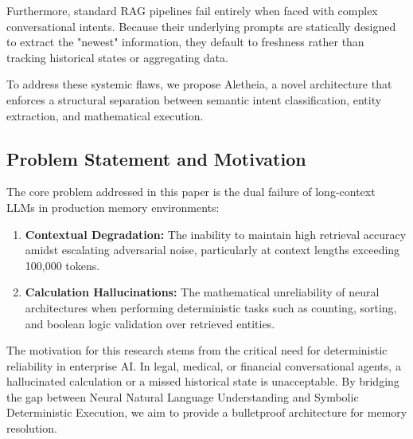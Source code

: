 \documentclass[journal,10pt]{IEEEtran}
\begin{document}
Furthermore, standard RAG pipelines fail entirely when faced with complex conversational intents. Because their underlying prompts are statically designed to extract the "newest" information, they default to freshness rather than tracking historical states or aggregating data. 

To address these systemic flaws, we propose Aletheia, a novel architecture that enforces a structural separation between semantic intent classification, entity extraction, and mathematical execution. 

\subsection{Problem Statement and Motivation}
The core problem addressed in this paper is the dual failure of long-context LLMs in production memory environments:
\begin{enumerate}
    \item \textbf{Contextual Degradation:} The inability to maintain high retrieval accuracy amidst escalating adversarial noise, particularly at context lengths exceeding 100,000 tokens.
    \item \textbf{Calculation Hallucinations:} The mathematical unreliability of neural architectures when performing deterministic tasks such as counting, sorting, and boolean logic validation over retrieved entities.
\end{enumerate}
The motivation for this research stems from the critical need for deterministic reliability in enterprise AI. In legal, medical, or financial conversational agents, a hallucinated calculation or a missed historical state is unacceptable. By bridging the gap between Neural Natural Language Understanding and Symbolic Deterministic Execution, we aim to provide a bulletproof architecture for memory resolution.
\end{document}
